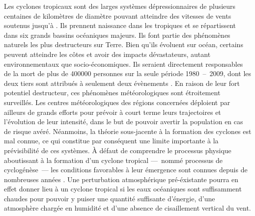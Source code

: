 \documentclass[../main.tex]{subfiles}
\begin{document}
Les cyclones tropicaux sont des larges systèmes dépressionnaires de plusieurs centaines de kilomètres de diamètre pouvant atteindre des vitesses de vents
soutenus jusqu'à . Ils prennent naissance dans les tropiques et se répartissent dans six grands bassins océaniques majeurs. Ils font partie des
phénomènes naturels les plus destructeurs sur Terre. Bien qu'ils évoluent sur océan, certains peuvent atteindre les côtes et avoir des impacts dévastateurs,
autant environnementaux que socio-économiques. Ils seraient directement responsables de la mort de plus de \num{400000} personnes sur la seule période
\num{1980}~--~\num{2009}, dont les deux tiers sont attribués à seulement deux évènements \parencite{doocy_human_2013}. En raison de leur fort potentiel
destructeur, ces phénomènes météorologiques sont étroitement surveillés. Les centres météorologiques des régions concernées déploient par ailleurs de grands
efforts pour prévoir à court terme leurs trajectoires et l'évolution de leur intensité, dans le but de pouvoir avertir la population en cas de risque avéré.
Néanmoins, la théorie sous-jacente à la formation des cyclones est mal connue, ce qui constitue par conséquent une limite importante à la prévisibilité de ces
systèmes. À défaut de comprendre le processus physique aboutissant à la formation d'un cyclone tropical ---~nommé processus de cyclogénèse~--- les conditions
favorables à leur émergence sont connues depuis de nombreuses années \parencite{gray_tropical_1975}. Une perturbation atmosphérique pré-éxistante pourra en
effet donner lieu à un cyclone tropical si les eaux océaniques sont suffisamment chaudes pour pouvoir y puiser une quantité suffisante d'énergie, d'une
atmosphère chargée en humidité et d'une absence de cisaillement vertical du vent.

\end{document}
